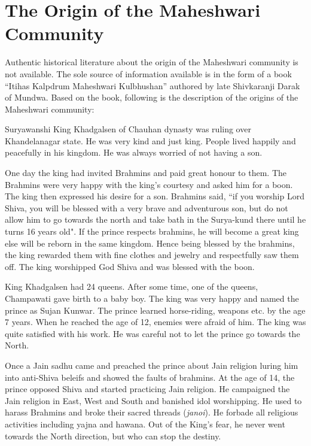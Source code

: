 \chapter{The Origin of the Maheshwari Community}
Authentic historical literature about the origin of the Maheshwari community is not available. The sole source of information available is in the form of a book ``Itihas Kalpdrum Maheshwari Kulbhushan'' authored by late Shivkaranji Darak of Mundwa. Based on the book, following is the description of the origins of the Maheshwari community:

Suryawanshi King Khadgalsen of Chauhan dynasty was ruling over Khandelanagar state. He was very kind and just king. People lived happily and peacefully in his kingdom. He was always worried of not having a son.

One day the king had invited Brahmins and paid great honour to them. The Brahmins were very happy with the king's courtesy and asked him for a boon. The king then expressed his desire for a son. Brahmins said, ``if you worship Lord Shiva, you will be blessed with a very brave and adventurous son, but do not allow him to go towards the north and take bath in the Surya-kund there until he turns 16 years old". If the prince respects brahmins, he will become a great king else will be reborn in the same kingdom. Hence being blessed by the brahmins, the king rewarded them with fine clothes and jewelry and respectfully saw them off. The king worshipped God Shiva and was blessed with the boon.

King Khadgalsen had 24 queens. After some time, one of the queens, Champawati gave birth to a baby boy. The king was very happy and named the prince as Sujan Kunwar. The prince learned horse-riding, weapons etc. by the age 7 years. When he reached the age of 12, enemies were afraid of him. The king was quite satisfied with his work. He was careful not to let the prince go towards the North.

Once a Jain sadhu came and preached the prince about Jain religion luring him into anti-Shiva beleifs and showed the faults of brahmins. At the age of 14, the prince opposed Shiva and started practicing Jain religion. He campaigned the Jain religion in East, West and South and banished idol worshipping. He used to harass Brahmins and broke their sacred threads (\textit{janoi}). He forbade all religious activities including yajna and hawana. Out of the King's fear, he never went towards the North direction, but who can stop the destiny.

